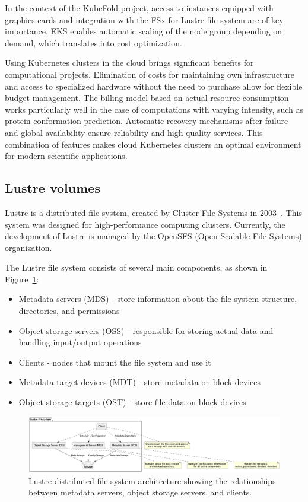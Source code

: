 In the context of the KubeFold project, access to instances equipped with graphics cards and integration with the FSx for Lustre file system are of key importance.
EKS enables automatic scaling of the node group depending on demand, which translates into cost optimization.

Using Kubernetes clusters in the cloud brings significant benefits for computational projects.
Elimination of costs for maintaining own infrastructure and access to specialized hardware without the need to purchase allow for flexible budget management.
The billing model based on actual resource consumption works particularly well in the case of computations with varying intensity, such as protein conformation prediction.
Automatic recovery mechanisms after failure and global availability ensure reliability and high-quality services.
This combination of features makes cloud Kubernetes clusters an optimal environment for modern scientific applications.

\subsection{Lustre volumes}

Lustre is a distributed file system, created by Cluster File Systems in 2003~\cite{lustre_fs}.
This system was designed for high-performance computing clusters.
Currently, the development of Lustre is managed by the OpenSFS (Open Scalable File Systems) organization.

The Lustre file system consists of several main components, as shown in Figure~\ref{fig:lustre-arch}:
\begin{itemize}
    \item Metadata servers (MDS) - store information about the file system structure, directories, and permissions
    \item Object storage servers (OSS) - responsible for storing actual data and handling input/output operations
    \item Clients - nodes that mount the file system and use it
    \item Metadata target devices (MDT) - store metadata on block devices
    \item Object storage targets (OST) - store file data on block devices
\end{itemize}

\begin{figure}[htbp]
    \centering
    \includegraphics[width=\textwidth]{images/lustre.png}
    \caption{Lustre distributed file system architecture showing the relationships between metadata servers, object storage servers, and clients.}
    \label{fig:lustre-arch}
\end{figure}

